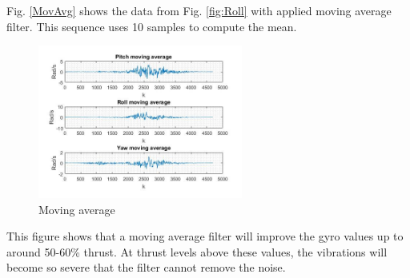Fig. \ref{MovAvg} shows the data from Fig. \ref{fig:Roll} with applied moving average filter.
This sequence uses 10 samples to compute the mean. 
\begin{figure}[H]
    \centering
         \includegraphics[width = 0.6\textwidth]{VAPIQ-PICTURES/MovingAverageFigure.jpg}
      \caption{Moving average}
    \label{fig:MovAvg}
\end{figure} 
This figure shows that a moving average filter will improve the gyro values up to around 50-60\% thrust. At thrust levels above these values, the vibrations will become so severe that the filter cannot remove the noise. 
